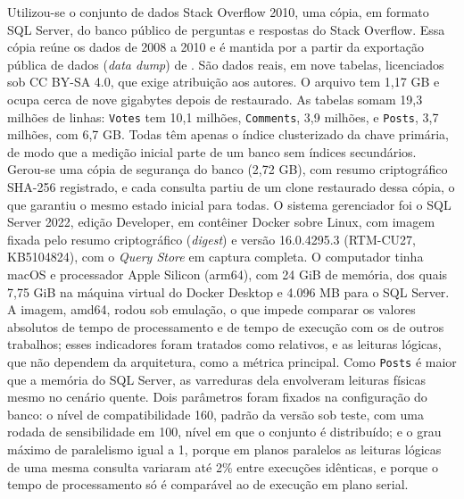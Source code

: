 Utilizou-se o conjunto de dados Stack Overflow 2010, uma cópia, em formato SQL Server, do banco público de perguntas e respostas do Stack Overflow. Essa cópia reúne os dados de 2008 a 2010 e é mantida por  a partir da exportação pública de dados (\textit{data dump}) de . São dados reais, em nove tabelas, licenciados sob CC BY-SA 4.0, que exige atribuição aos autores. O arquivo tem 1,17 GB e ocupa cerca de nove gigabytes depois de restaurado. As tabelas somam 19,3 milhões de linhas: \texttt{Votes} tem 10,1 milhões, \texttt{Comments}, 3,9 milhões, e \texttt{Posts}, 3,7 milhões, com 6,7 GB. Todas têm apenas o índice clusterizado da chave primária, de modo que a medição inicial parte de um banco sem índices secundários. Gerou-se uma cópia de segurança do banco (2,72 GB), com resumo criptográfico SHA-256 registrado, e cada consulta partiu de um clone restaurado dessa cópia, o que garantiu o mesmo estado inicial para todas. 
O sistema gerenciador foi o SQL Server 2022, edição Developer, em contêiner Docker sobre Linux, com imagem fixada pelo resumo criptográfico (\textit{digest}) e versão 16.0.4295.3 (RTM-CU27, KB5104824), com o \textit{Query Store} em captura completa. O computador tinha macOS e processador Apple Silicon (arm64), com 24 GiB de memória, dos quais 7,75 GiB na máquina virtual do Docker Desktop e 4.096 MB para o SQL Server. A imagem, amd64, rodou sob emulação, o que impede comparar os valores absolutos de tempo de processamento e de tempo de execução com os de outros trabalhos; esses indicadores foram tratados como relativos, e as leituras lógicas, que não dependem da arquitetura, como a métrica principal. Como \texttt{Posts} é maior que a memória do SQL Server, as varreduras dela envolveram leituras físicas mesmo no cenário quente. Dois parâmetros foram fixados na configuração do banco: o nível de compatibilidade 160, padrão da versão sob teste, com uma rodada de sensibilidade em 100, nível em que o conjunto é distribuído; e o grau máximo de paralelismo igual a 1, porque em planos paralelos as leituras lógicas de uma mesma consulta variaram até 2\% entre execuções idênticas, e porque o tempo de processamento só é comparável ao de execução em plano serial.

